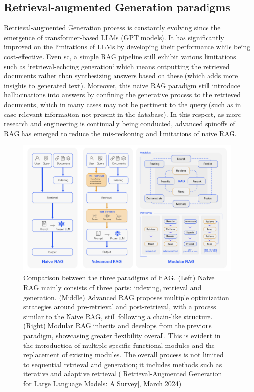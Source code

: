 \subsection{Retrieval-augmented Generation paradigms}
Retrieval-augmented Generation process is constantly evolving since the emergence of transformer-based LLMs (GPT models). It has significantly improved on the limitations of LLMs by developing their performance while being cost-effective. Even so, a simple RAG pipeline still exhibit various limitations such as `retrieval-echoing generation` which means outputting the retrieved documents rather than synthesizing answers based on these (which adds more insights to generated text). Moreover, this naive RAG paradigm still introduce hallucinations into answers by confining the generative process to the retrieved documents, which in many cases may not be pertinent to the query (such as in case relevant information not present in the database). In this respect, as more research and engineering is continually being conducted, advanced spinoffs of RAG has emerged to reduce the mis-reckoning and limitations of naive RAG.
\begin{figure}[htbp]
    \centering
    \includegraphics[width=\linewidth]{./figures/RAG_FrameCompre_eng.png}
    \caption{Comparison between the three paradigms of RAG. (Left) Naive RAG mainly consists of three parts: indexing, retrieval and generation. (Middle) Advanced RAG proposes multiple optimization strategies around pre-retrieval and post-retrieval, with a process similar to the Naive RAG, still following a chain-like structure. (Right) Modular RAG inherits and develops from the previous paradigm, showcasing greater flexibility overall. This is evident in the introduction of multiple specific functional modules and the replacement of existing modules. The overall process is not limited to sequential retrieval and generation; it includes methods such as iterative and adaptive retrieval (\href{https://arxiv.org/html/2312.10997v5}{[Retrieval-Augmented Generation for Large Language Models: A Survey]}, March 2024)}
\end{figure}\newpage

